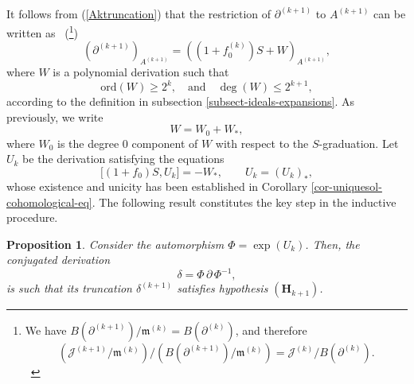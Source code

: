 \documentclass[10pt,twoside,reqno]{amsart}
\newtheorem{proposition}[thm]{Proposition}
\theoremstyle{remark}
\theoremstyle{remark}
\newcommand{\tmmathbf}[1]{{\boldsymbol{#1}}}
\newcommand{\ord}{\mathrm{ord}}
\begin{document}
It follows from (\ref{Aktruncation})
that the restriction of $\partial^{(k + 1)}$ to $A^{(k + 1)}$ can be written
as \ (\footnote{We have $B  (\partial^{(k + 1)}) / \mathfrak{m}^{(k)} = B
(\partial^{(k)})$, and therefore
\[     ({\mathcal{J}^{(k + 1)} / \mathfrak{m}^{(k)}})  \Big/ ( {B  (\partial^{(k + 1)}) /
   \mathfrak{m}^{(k)}}) = \mathcal{J}^{(k)} / B (\partial^{(k)}). \]
\ })
\begin{equation}\label{definition-of-W}
 (\partial^{(k + 1)})_{A^{(k + 1)}} = ((1 + f_0^{(k)}) S + W)_{A^{(k + 1)}}, 
\end{equation}
where $W$ is a polynomial derivation such that 
$$\ord(W) \ge 2^k, \quad \text{and}\quad \deg(W) \le 2^{k+1},$$
according to the definition in subsection \ref{subsect-ideals-expansions}. As previously, we write 
$$W = W_0 + W_\ast,$$
where $W_0$ is the degree $0$ component of $W$ with respect to the $S$-graduation. 
Let $U_k$ be the derivation satisfying the equations 
\begin{equation}\label{eq:homological}
    \big[ (1 + f_0) S, U_k \big] = - W_{\ast},\qquad U_k = (U_k)_\ast,
\end{equation}
whose existence and unicity has been established in Corollary \ref{cor-uniquesol-cohomological-eq}. The following result constitutes the key step in the inductive procedure.   
\begin{proposition}\label{prop:formalinductivestep}
Consider the automorphism $\Phi = \exp (U_k)$. Then, the conjugated
  derivation
  \[ \delta = \Phi\, \partial\, \Phi^{- 1}, \]
  is such that its truncation $\delta^{(k + 1)}$ satisfies hypothesis $(\tmmathbf{H}_{k +
  1})$. 
\end{proposition}
\end{document}
